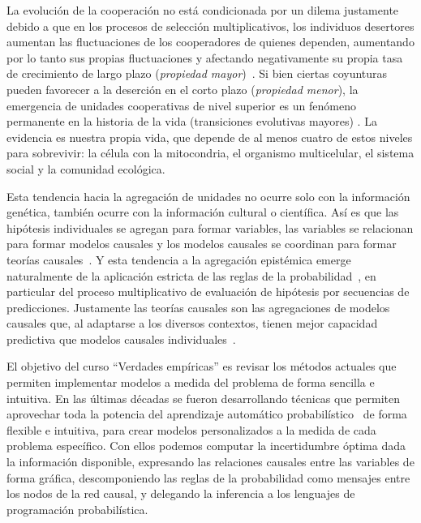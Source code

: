 \documentclass[10pt]{article}
\begin{document}

La evolución de la cooperación no está condicionada por un dilema justamente debido a que en los procesos de selección multiplicativos, los individuos desertores aumentan las fluctuaciones de los cooperadores de quienes dependen, aumentando por lo tanto sus propias fluctuaciones y afectando negativamente su propia tasa de crecimiento de largo plazo (\emph{propiedad mayor})~\cite{GustavoLandfried}.
Si bien ciertas coyunturas pueden favorecer a la deserción en el corto plazo (\emph{propiedad menor}), la emergencia de unidades cooperativas de nivel superior es un fenómeno permanente en la historia de la vida (transiciones evolutivas mayores) \cite{maynardSmith}.
La evidencia es nuestra propia vida, que depende de al menos cuatro de estos niveles para sobrevivir: la célula con la mitocondria, el organismo multicelular, el sistema social y la comunidad ecológica.


Esta tendencia hacia la agregación de unidades no ocurre solo con la información genética, también ocurre con la información cultural o científica.
Así es que las hipótesis individuales se agregan para formar variables, las variables se relacionan para formar modelos causales y los modelos causales se coordinan para formar teorías causales~\cite{pearl2009-causality}.
Y esta tendencia a la agregación epistémica emerge naturalmente de la aplicación estricta de las reglas de la probabilidad~\cite{winn2012-causality}, en particular del proceso multiplicativo de evaluación de hipótesis por secuencias de predicciones.
Justamente las teorías causales son las agregaciones de modelos causales que, al adaptarse a los diversos contextos, tienen mejor capacidad predictiva que modelos causales individuales~\cite{winn2012-causality}.


El objetivo del curso ``Verdades empíricas'' es revisar los métodos actuales que permiten implementar modelos a medida del problema de forma sencilla e intuitiva.
En las últimas décadas se fueron desarrollando técnicas que permiten aprovechar toda la potencia del aprendizaje automático probabilístico~\cite{murphy-pmlBook1,murphy-pmlBook2} de forma flexible e intuitiva, para crear modelos personalizados a la medida de cada problema específico.
Con ellos podemos computar la incertidumbre óptima dada la información disponible, expresando las relaciones causales entre las variables de forma gráfica, descomponiendo las reglas de la probabilidad como mensajes entre los nodos de la red causal, y delegando la inferencia a los lenguajes de programación probabilística.
\end{document}
